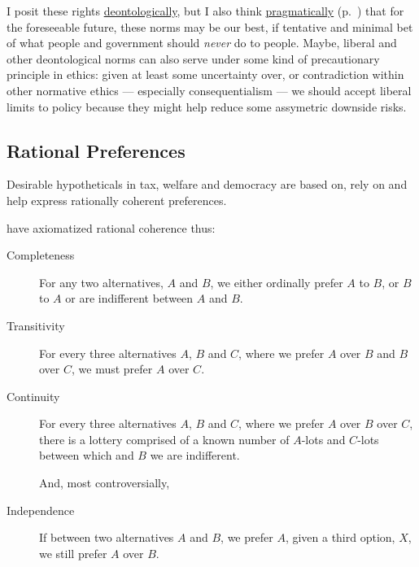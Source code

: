 I posit these rights \hyperref[sec:deontological]{deontologically}, but I also think \hyperref[itm:pragmatic-ethics]{pragmatically} (p.~\pageref{itm:pragmatic-ethics}) that for the foreseeable future, these norms may be our best, if tentative and minimal bet of what people and government should \emph{never} do to people. 
Maybe, liberal and other deontological norms can also serve under some kind of precautionary principle in ethics: given at least some uncertainty over, or contradiction within other normative ethics --- especially consequentialism --- we should accept liberal limits to policy because they might help reduce some assymetric downside risks.

\subsection[Rational]{Rational Preferences} \label{sec:rational} %
Desirable hypotheticals in tax, welfare and democracy are based on, rely on and help express rationally coherent preferences.

\cite{VonNeumannMorgenstern1944} have axiomatized rational coherence thus:
\begin{description}
	\item[Completeness  \label{itm:completeness}] For any two alternatives, $A$ and $B$, we either ordinally prefer $A$ to $B$, or $B$ to $A$ or are indifferent between $A$ and $B$.
	\item[Transitivity  \label{itm:transitivity}] For every three alternatives $A$, $B$ and $C$, where we prefer $A$ over $B$ and $B$ over $C$, we must prefer $A$ over $C$.
	\item[Continuity  \label{itm:continuity}] For every three alternatives	$A$, $B$ and $C$, where we prefer $A$ over $B$ over $C$, there is a lottery comprised of a known number of $A$-lots and $C$-lots between which and $B$ we are indifferent.
		
	And, most controversially,
		
	\item[Independence  \label{itm:independence}] If between two alternatives $A$ and $B$, we prefer $A$, given a third option, $X$, we still prefer $A$ over $B$.	
\end{description}

